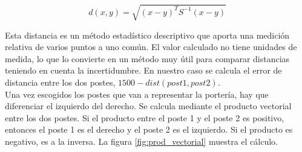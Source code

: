 \begin{equation}
  d(x,y) = \sqrt{(x-y)^T S^{-1} (x-y)}
\end{equation}

Esta distancia es un método estadístico descriptivo que aporta una medición relativa de varios puntos a uno común. El valor calculado no tiene unidades de medida, lo que lo convierte en un método muy útil para comparar distancias teniendo en cuenta la incertidumbre. En nuestro caso se calcula el error de distancia entre los dos postes, $1500 - dist(post1,post2)$. \\

Una vez escogidos los postes que van a representar la portería, hay que diferenciar el izquierdo del derecho. Se calcula mediante el producto vectorial entre los dos postes. Si el producto entre el poste 1 y el poste 2 es positivo, entonces el poste 1 es el derecho y el poste 2 es el izquierdo. Si el producto es negativo, es a la inversa. La figura \ref{fig:prod_vectorial} muestra el cálculo.
